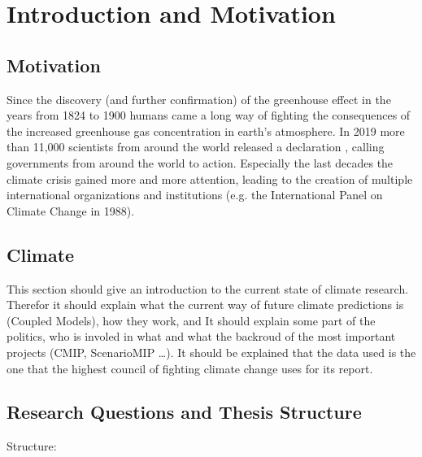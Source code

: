 \chapter{Introduction and Motivation}
\label{ch:intro}


\section{Motivation}
\label{sec:motivation}


Since the discovery (and further confirmation) of the greenhouse effect in the years from 1824 to 1900  humans came a long way of fighting the consequences of the increased greenhouse gas concentration in earth's atmosphere. 
In 2019 more than 11,000  scientists from around the world released a declaration \cite{ripple_world_2019}, calling governments from around the world to action.
Especially the last decades the climate crisis gained more and more attention, leading to the creation of multiple international organizations and institutions (e.g. the International Panel on Climate Change in 1988).



\section{Climate}
\label{sec:climate}

This section should give an introduction to the current state of climate research. 
Therefor it should explain what the current way of future climate predictions is (Coupled Models), how they work, and 
It should explain some part of the politics, who is involed in what and what the backroud of the most important projects (CMIP, ScenarioMIP \dots). 
It should be explained that the data used is the one that the highest council of fighting climate change uses for its report. 



\section{Research Questions and Thesis Structure}
\label{sec:research_questions}


Structure:

